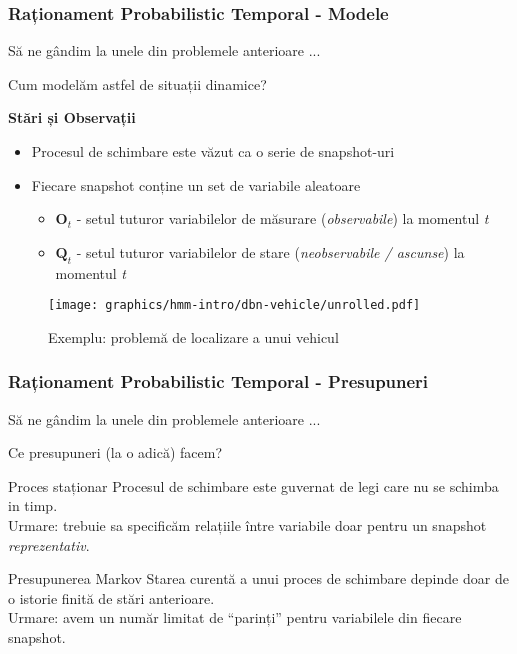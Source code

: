 \begin{frame}[t]
  \frametitle{Raționament Probabilistic Temporal - Modele}
	
	Să ne gândim la unele din problemele anterioare ...	
	\vspace*{0.5em}
	\pause	
	
	Cum modelăm astfel de situații dinamice? 
	\vspace*{0.5em}
	\pause	
	
	\textbf{Stări și Observații}
	\begin{itemize}
		\item Procesul de schimbare este văzut ca o serie de \alert{snapshot-uri}
		\item Fiecare snapshot conține un set de variabile aleatoare
    	\begin{itemize}
			\item $\mathbf{O}_t$ - setul tuturor variabilelor de măsurare (\alert{\emph{observabile}}) la momentul \emph{t}
			\item $\mathbf{Q}_t$ - setul tuturor variabilelor de stare (\alert{\emph{neobservabile / ascunse}}) la momentul \emph{t}	    	
		\end{itemize}
	\end{itemize}
	
	\begin{figure}
		\centering
		\texttt{[image: graphics/hmm-intro/dbn-vehicle/unrolled.pdf]} 
  		\caption{\tiny{Exemplu: problemă de localizare a unui vehicul \citep{KollerFriedman09}}}
  		\label{fig:unrolled-states-observations}
  	\end{figure}
\end{frame}

\begin{frame}[t]
  \frametitle{Raționament Probabilistic Temporal - Presupuneri}
	Să ne gândim la unele din problemele anterioare ...	
	\vspace*{0.5em}
	\pause	
	
	Ce \alert{presupuneri} (la o adică) facem?
	\pause	
	
	\begin{block}{Proces staționar}
		Procesul de schimbare este guvernat de legi care \alert{nu se schimba in timp}.\\
		\alert{Urmare:} trebuie sa specificăm relațiile între variabile doar pentru un snapshot \emph{reprezentativ}.	
	\end{block}
	\pause	
	
	\begin{block}{Presupunerea Markov}
		Starea curentă a unui proces de schimbare depinde doar de o \alert{istorie finită} de stări anterioare.\\
		\alert{Urmare:} avem un număr \alert{limitat} de ``parinți'' pentru variabilele din fiecare snapshot.
	\end{block}
  
\end{frame}

